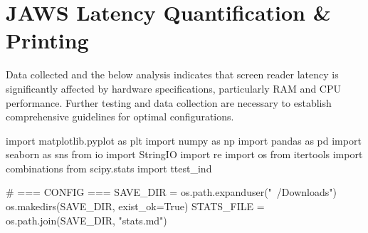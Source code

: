 \section{JAWS Latency Quantification \& Printing}
Data collected and the below analysis indicates that screen reader latency is significantly affected by hardware specifications, particularly RAM and CPU performance. Further testing and data collection are necessary to establish comprehensive guidelines for optimal configurations.
\begin{pyverbatim}
import matplotlib.pyplot as plt
import numpy as np
import pandas as pd
import seaborn as sns
from io import StringIO
import re
import os
from itertools import combinations
from scipy.stats import ttest_ind

# === CONFIG ===
SAVE_DIR = os.path.expanduser("~/Downloads")
os.makedirs(SAVE_DIR, exist_ok=True)
STATS_FILE = os.path.join(SAVE_DIR, "stats.md")


\end{pyverbatim}
